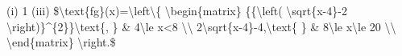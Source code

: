 \item (i) 1 (iii) \$\textbackslash text\{fg\}(x)=\textbackslash left\textbackslash\{
\textbackslash begin\{matrix\} \{\{\textbackslash left( \textbackslash sqrt\{x-4\}-2
\textbackslash right)\}\textasciicircum\{2\}\}\textbackslash text\{,
\} \& 4\textbackslash le x<8 \textbackslash\textbackslash{} 2\textbackslash sqrt\{x-4\}-4,\textbackslash text\{
\} \& 8\textbackslash le x\textbackslash le 20 \textbackslash\textbackslash{}
\textbackslash end\{matrix\} \textbackslash right.\$